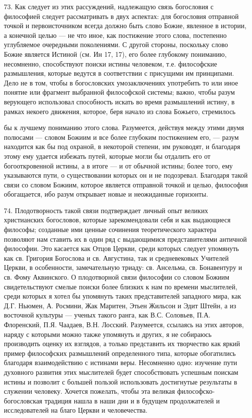 \documentclass[a5paper,10pt]{article}
\begin{document}
73. Как следует из этих рассуждений, надлежащую связь богословия с философией
следует рассматривать в двух аспектах: для богословия отправной точкой и
первоисточником всегда должно быть слово Божие, явленное в истории, а конечной
целью — не что иное, как постижение этого слова, постепенно углубляемое
очередными поколениями. С другой стороны, поскольку слово Божие является
Истиной (см. Ин 17, 17), его более глубокому пониманию, несомненно,
способствуют поиски истины человеком, т.е. философские размышления, которые
ведутся в соответствии с присущими им принципами. Дело не в том, чтобы в
богословских умозаключениях употребить то или иное понятие или фрагмент
выбранной философской системы; важно, чтобы разум верующего использовал
способность искать во время размышлений истину, в рамках некоего движения,
которое, беря начало из слова Божьего, стремилось

бы к лучшему пониманию этого слова. Разумеется, действуя между этими двумя
полюсами — словом Божиим и все более глубоким постижением его, — разум
находится как бы под охраной, в некоторой степени, им руководят, и благодаря
этому ему удается избежать путей, которые могли бы отдалить его от
богооткровенной истины, а в итоге — и от обычной истины; более того, ему
указываются пути, о существовании которых он и не подозревал. Благодаря такой
связи со словом Божиим, которое является отправной точкой и целью, философия
обогащается, ибо разум открывает новые и неожиданные горизонты.

74. Плодотворность такой связи подтверждает личный опыт великих христианских
богословов, которые зарекомендовали себя и как выдающиеся философы; созданные
ими ценные сочинения теоретического характера позволяют нам ставить их в один
ряд с выдающимися представителями античной философии. Это касается как Отцов
Церкви, среди которых следует упомянуть как св. Григория Богослова и св.
Августина, так и средневековых Учителей Церкви, в особенности, замечательную
триаду: св. Ансельма, св. Бонавентуру и св. Фому Аквинского. О плодотворной
связи философии со словом Божиим свидетельствуют смелые поиски более близких к
нам по времени мыслителей, среди которых я хотел бы упомянуть таких
представителей западного мира, как Д.Г. Ньюмен, А. Росмини, Жак Маритен, Этьен
Жильсон и Эдит Штейн, а из восточной культуры — ученых такого ранга, как В.С.
Соловьев, П.А. Флоренский, П.Я. Чаадаев, В.Н. Лосский. Разумеется, ссылаясь на
этих авторов, наряду с которыми можно также упомянуть и других, я не собираюсь
производить оценку их взглядов, а только представить их творчество как яркий
пример философских размышлений определенного типа, которые обогатились
благодаря взаимодействию с истинами веры. Несомненно одно: изучение пути
духовного развития этих мыслителей будет способствовать успешным поискам истины
и позволит с большей пользой использовать достигнутые результаты в служении
человеку. Хочется пожелать, чтобы эта великая философско-богословская традиция
нашла в наши дни и в будущем продолжателей и исследователей на благо Церкви и
человечества.
\end{document}
